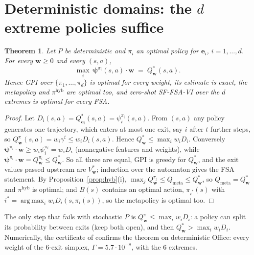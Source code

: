 \documentclass[11pt]{article}
\newcommand{\vpsi}{\bm{\psi}}
\newcommand{\w}{\mathbf{w}}
\newcommand{\e}{\mathbf{e}}
\DeclareMathOperator*{\argmax}{arg\,max}
\newtheorem{theorem}{Theorem}
\begin{document}
\section{Deterministic domains: the \texorpdfstring{$d$}{d} extreme policies suffice}
\begin{theorem}\label{thm:det}
Let $P$ be deterministic and $\pi_i$ an optimal policy for $\e_i$, $i=1,\dots,d$. For every $\w\ge0$ and every $(s,a)$,
\[\max_i\ \vpsi^{\pi_i}(s,a)\cdot\w\;=\;Q^*_\w(s,a).\]
Hence GPI over $\{\pi_1,\dots,\pi_d\}$ is optimal for every weight, its estimate is exact, the metapolicy and
$\pi^{\mathrm{hyb}}$ are optimal too, and zero-shot SF-FSA-VI over the $d$ extremes is optimal for every FSA.
\end{theorem}
\begin{proof}
Let $D_i(s,a)=Q^*_{\e_i}(s,a)=\psi^{\pi_i}_i(s,a)$. From $(s,a)$ any policy generates one trajectory, which enters at
most one exit, say $i$ after $t$ further steps, so $Q^\pi_\w(s,a)=w_i\gamma^t\le w_iD_i(s,a)$. Hence
$Q^*_\w\le\max_iw_iD_i$. Conversely $\vpsi^{\pi_i}\cdot\w\ge w_i\psi^{\pi_i}_i=w_iD_i$ (nonnegative features and
weights), while $\vpsi^{\pi_i}\cdot\w=Q^{\pi_i}_\w\le Q^*_\w$. So all three are equal, GPI is greedy for $Q^*_\w$, and
the exit values passed upstream are $V^*_\w$; induction over the automaton gives the FSA statement. By Proposition~\ref{prop:hyb}(i), $\max_jQ^{\pi_j}_\w\le
Q_{\mathrm{meta}}\le Q^*_\w$, so $Q_{\mathrm{meta}}=Q^*_\w$ and $\pi^{\mathrm{hyb}}$ is optimal; and $B(s)$ contains an
optimal action, $\pi_{i^*}(s)$ with $i^*=\argmax_iw_iD_i(s,\pi_i(s))$, so the metapolicy is optimal too.
\end{proof}
\noindent The only step that fails with stochastic $P$ is $Q^\pi_\w\le\max_iw_iD_i$: a policy can split its
probability between exits (keep both open), and then $Q^*_\w>\max_iw_iD_i$. Numerically, the certificate of
\cite{note} confirms the theorem on deterministic Office: every weight of the 6-exit simplex, $\Gamma=5.7\cdot10^{-8}$,
with the 6 extremes.
\end{document}
